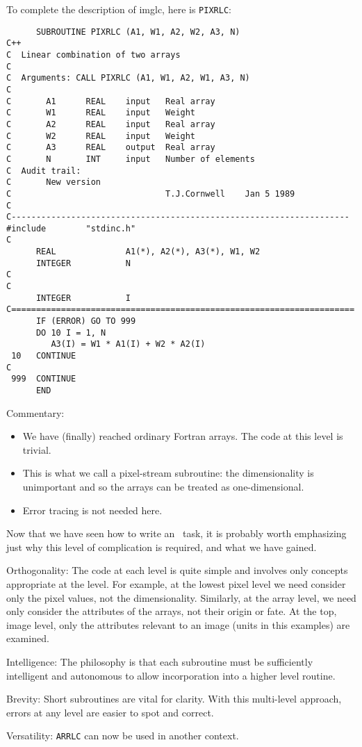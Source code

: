 To complete the description of imglc, here is {\tt PIXRLC}:
\begin{verbatim}
      SUBROUTINE PIXRLC (A1, W1, A2, W2, A3, N)
C++
C  Linear combination of two arrays
C
C  Arguments: CALL PIXRLC (A1, W1, A2, W1, A3, N)
C 
C       A1      REAL    input   Real array
C       W1      REAL    input   Weight
C       A2      REAL    input   Real array
C       W2      REAL    input   Weight
C       A3      REAL    output  Real array
C       N       INT     input   Number of elements
C  Audit trail:
C       New version
C                               T.J.Cornwell    Jan 5 1989
C
C--------------------------------------------------------------------
#include        "stdinc.h"
C
      REAL              A1(*), A2(*), A3(*), W1, W2
      INTEGER           N
C
C
      INTEGER           I
C=====================================================================
      IF (ERROR) GO TO 999
      DO 10 I = 1, N
         A3(I) = W1 * A1(I) + W2 * A2(I)
 10   CONTINUE
C
 999  CONTINUE
      END
\end{verbatim}
Commentary:
\begin{itemize}
\item We have (finally) reached ordinary Fortran arrays. The code at this
level is trivial. 
\item This is what we call a pixel-stream subroutine: the dimensionality is
unimportant and so the arrays can be treated as one-dimensional.
\item Error tracing is not needed here.
\end{itemize}

Now that we have seen how to write an \sde\ task, it is probably worth 
emphasizing just why this level of complication is required, and what we
have gained. 
\begin{description}
\item{Orthogonality}: The code at each level is quite simple and involves
only concepts appropriate at the level. For example, at the lowest pixel
level we need consider only the pixel values, not the dimensionality.
Similarly, at the array level, we need only consider the attributes of
the arrays, not their origin or fate. At the top, image level, only the
attributes relevant to an image (units in this examples) are examined.
\item{Intelligence}: The philosophy is that
each subroutine must be sufficiently intelligent and autonomous to allow
incorporation into a higher level routine.
\item{Brevity}: Short subroutines are vital for clarity. With this multi-level
approach, errors at any level are easier to spot and correct.
\item{Versatility}: {\tt ARRLC} can now be used in another context.
\end{description}

